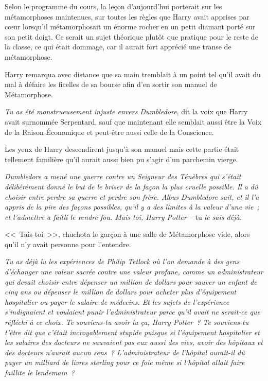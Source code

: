 Selon le programme du cours, la leçon d'aujourd'hui porterait sur les métamorphoses maintenues, sur toutes les règles que Harry avait apprises par cœur lorsqu'il métamorphosait un énorme rocher en un petit diamant porté sur son petit doigt. Ce serait un sujet théorique plutôt que pratique pour le reste de la classe, ce qui était dommage, car il aurait fort apprécié une transe de métamorphose.

Harry remarqua avec distance que sa main tremblait à un point tel qu'il avait du mal à défaire les ficelles de sa bourse afin d'en sortir son manuel de Métamorphose.

\emph{Tu as été monstrueusement injuste envers Dumbledore}, dit la voix que Harry avait surnommée Serpentard, sauf que maintenant elle semblait aussi être la Voix de la Raison Économique et peut-être aussi celle de la Conscience.

Les yeux de Harry descendirent jusqu'à son manuel mais cette partie était tellement familière qu'il aurait aussi bien pu s'agir d'un parchemin vierge.

\emph{Dumbledore a mené une guerre contre un Seigneur des Ténèbres qui s'était délibérément donné le but de le briser de la façon la plus cruelle possible. Il a dû choisir entre perdre sa guerre et perdre son frère. Albus Dumbledore sait, et il l'a appris de la pire des façons possibles, qu'il y a des limites à la valeur d'une vie~; et l'admettre a failli le rendre fou. Mais toi, Harry Potter --} tu \emph{le sais déjà.}

<<~Tais-toi~>>, chuchota le garçon à une salle de Métamorphose vide, alors qu'il n'y avait personne pour l'entendre.

\emph{Tu as déjà lu les expériences de Philip Tetlock où l'on demande à des gens d'échanger une valeur sacrée contre une valeur profane, comme un administrateur qui devait choisir entre dépenser un million de dollars pour sauver un enfant de cinq ans ou dépenser le million de dollars pour acheter plus d'équipement hospitalier ou payer le salaire de médecins. Et les sujets de l'expérience s'indignaient et voulaient punir l'administrateur parce qu'il avait ne serait-ce que réfléchi à ce choix. Te souviens-tu avoir lu ça, Harry Potter~? Te souviens-tu t'être dit que c'était incroyablement stupide puisque si l'équipement hospitalier et les salaires des docteurs ne sauvaient pas eux aussi des vies, avoir des hôpitaux et des docteurs n'aurait aucun sens~? L'administrateur de l'hôpital aurait-il dû payer un milliard de livres sterling pour ce foie même si l'hôpital allait faire faillite le lendemain~?}

